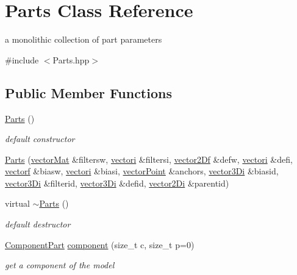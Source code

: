 \hypertarget{classParts}{}\section{Parts Class Reference}
\label{classParts}


a monolithic collection of part parameters  




{\ttfamily \#include $<$Parts.\+hpp$>$}

\subsection*{Public Member Functions}
\begin{DoxyCompactItemize}
\item 
\hyperlink{classParts_a02ffe7271c4e268ee934710f91a203eb}{Parts} ()
\begin{DoxyCompactList}\small\item\em default constructor \end{DoxyCompactList}\item 
\hyperlink{classParts_ac8e1ad21c900825480d3f0e241808757}{Parts} (\hyperlink{types_8hpp_a3207a7addcfa415d1c83622febcb1e9b}{vector\+Mat} \&filtersw, \hyperlink{types_8hpp_a44529587d60e73bf0e689a82e5e70a55}{vectori} \&filtersi, \hyperlink{types_8hpp_a94f2d563f3725231a6f684b4dce4f1ef}{vector2\+Df} \&defw, \hyperlink{types_8hpp_a44529587d60e73bf0e689a82e5e70a55}{vectori} \&defi, \hyperlink{types_8hpp_a4da5db3ee9e284f719ef5764dbadffc8}{vectorf} \&biasw, \hyperlink{types_8hpp_a44529587d60e73bf0e689a82e5e70a55}{vectori} \&biasi, \hyperlink{types_8hpp_ac468fcf6870d6563ac8fa3669845afcc}{vector\+Point} \&anchors, \hyperlink{types_8hpp_a1f7c8ad00a53fb2d61b3656da9a6581d}{vector3\+Di} \&biasid, \hyperlink{types_8hpp_a1f7c8ad00a53fb2d61b3656da9a6581d}{vector3\+Di} \&filterid, \hyperlink{types_8hpp_a1f7c8ad00a53fb2d61b3656da9a6581d}{vector3\+Di} \&defid, \hyperlink{types_8hpp_a93a5e2cfd40d1ff1f10d8bbf11884c41}{vector2\+Di} \&parentid)
\item 
virtual \hyperlink{classParts_ac2df1f1a1d41444dff8ed4d4343aa64d}{$\sim$\+Parts} ()
\begin{DoxyCompactList}\small\item\em default destructor \end{DoxyCompactList}\item 
\hyperlink{classComponentPart}{Component\+Part} \hyperlink{classParts_ae4cd6034cce85efe0fa1b55bf5b2da47}{component} (size\+\_\+t c, size\+\_\+t p=0)
\begin{DoxyCompactList}\small\item\em get a component of the model \end{DoxyCompactList}\item 

\end{DoxyCompactItemize}
